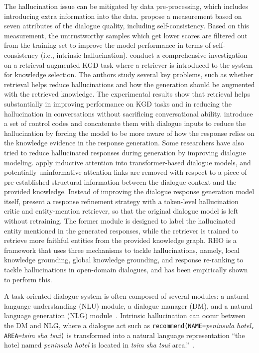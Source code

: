 The hallucination issue can be mitigated by data pre-processing, which includes introducing extra information into the data.  propose a measurement based on seven attributes of the dialogue quality, including self-consistency. Based on this measurement, the untrustworthy samples which get lower scores are filtered out from the training set to improve the model performance in terms of self-consistency (i.e., intrinsic hallucination). 
 conduct a comprehensive investigation on a retrieval-augmented KGD task where a retriever is introduced to the system for knowledge selection. The authors study several key problems, such as whether retrieval helps reduce hallucinations and how the generation should be augmented with the retrieved knowledge. The experimental results show that retrieval helps substantially in improving performance on KGD tasks and in reducing the hallucination in conversations without sacrificing conversational ability.
 introduce a set of control codes and concatenate them with dialogue inputs to reduce the hallucination by forcing the model to be more aware of how the response relies on the knowledge evidence in the response generation.
Some researchers have also tried to reduce hallucinated responses during generation by improving dialogue modeling.  apply inductive attention into transformer-based dialogue models, and potentially uninformative attention links are removed with respect to a piece of pre-established structural information between the dialogue context and the provided knowledge.
Instead of improving the dialogue response generation model itself,  present a response refinement strategy with a token-level hallucination critic and entity-mention retriever, so that the original dialogue model is left without retraining. The former module is designed to label the hallucinated entity mentioned in the generated responses, while the retriever is trained to retrieve more faithful entities from the provided knowledge graph.
RHO  is a framework that uses three mechanisms to tackle hallucinations, namely, local knowledge grounding, global knowledge grounding, and response re-ranking to tackle hallucinations in open-domain dialogues, and has been empirically shown to perform this.

A task-oriented dialogue system is often composed of several modules: a natural language understanding (NLU) module, a dialogue manager (DM), and a natural language generation (NLG) module~. Intrinsic hallucination can occur between the DM and NLG, where a dialogue act such as \texttt{recommend(NAME=}\textit{peninsula hotel}\texttt{, AREA=}\textit{tsim sha tsui}\texttt{)} is transformed into a natural language representation ``the hotel named \textit{peninsula hotel} is located in \textit{tsim sha tsui} area.''~.

